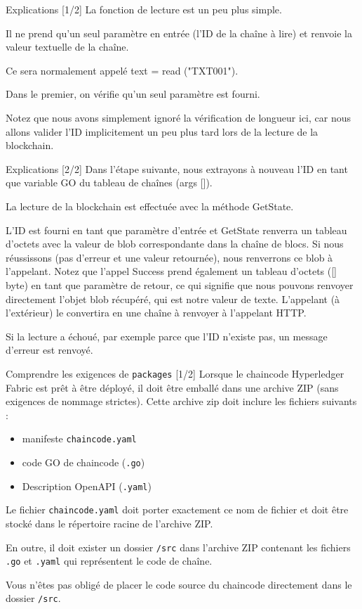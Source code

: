 \documentclass[presentation]{beamer}
\begin{document}
\begin{frame}[label={sec:org9ef61ca}]{Explications [1/2]}
La fonction de lecture est un peu plus simple. 

Il ne prend qu'un seul paramètre en entrée (l'ID de la chaîne à lire) et renvoie la valeur textuelle de la chaîne. 

Ce sera normalement appelé text = read ("TXT001"). 

Dans le premier, on vérifie qu'un seul paramètre est fourni. 

Notez que nous avons simplement ignoré la vérification de longueur ici, car nous allons valider l'ID implicitement 
un peu plus tard lors de la lecture de la blockchain.
\end{frame}

\begin{frame}[label={sec:org6f9e76c}]{Explications [2/2]}
Dans l'étape suivante, nous extrayons à nouveau l'ID en tant que variable GO du tableau de chaînes (args []).

La lecture de la blockchain est effectuée avec la méthode GetState. 

L'ID est fourni en tant que paramètre d'entrée et GetState renverra un tableau d'octets avec la valeur de blob 
correspondante dans la chaîne de blocs. Si nous réussissons (pas d'erreur et une valeur retournée), nous 
renverrons ce blob à l'appelant. Notez que l'appel Success prend également un tableau d'octets ([] byte) en 
tant que paramètre de retour, ce qui signifie que nous pouvons renvoyer directement l'objet blob récupéré, qui 
est notre valeur de texte. L'appelant (à l'extérieur) le convertira en une chaîne à renvoyer à l'appelant HTTP.

Si la lecture a échoué, par exemple parce que l'ID n'existe pas, un message d'erreur est renvoyé.
\end{frame}
\begin{frame}[fragile,label={sec:org9e2b86d}]{Comprendre les exigences de \texttt{packages} [1/2]}
 Lorsque le chaincode Hyperledger Fabric est prêt à être déployé, il doit être emballé dans une archive ZIP 
(sans exigences de nommage strictes). Cette archive zip doit inclure les fichiers suivants :

\begin{itemize}
\item manifeste \texttt{chaincode.yaml}
\item code GO de chaincode (\texttt{.go})
\item Description OpenAPI (\texttt{.yaml})
\end{itemize}


Le fichier \texttt{chaincode.yaml} doit porter exactement ce nom de fichier et doit être stocké dans le répertoire 
racine de l’archive ZIP.

En outre, il doit exister un dossier \texttt{/src} dans l’archive ZIP contenant les fichiers \texttt{.go} et \texttt{.yaml} qui 
représentent le code de chaîne. 

Vous n'êtes pas obligé de placer le code source du chaincode directement dans le dossier \texttt{/src}. 
\end{frame}
\end{document}

